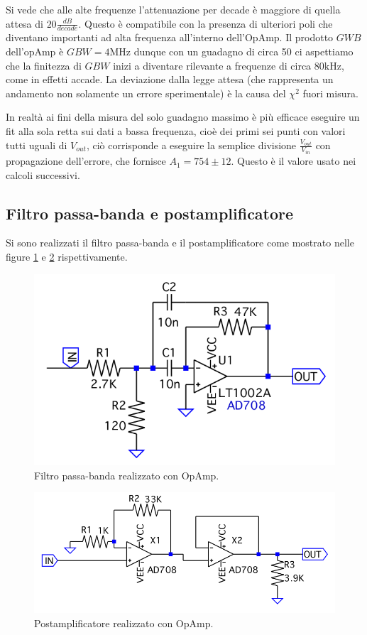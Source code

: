 \documentclass[10pt,a4paper]{article}
\begin{document}
Si vede che alle alte frequenze l'attenuazione per decade è maggiore di quella attesa di $20\frac{dB}{decade}$. Questo è compatibile con la presenza di ulteriori poli che diventano importanti ad alta frequenza all'interno dell'OpAmp. Il prodotto $GWB$ dell'opAmp è $GBW = 4 \mbox{MHz}$ dunque con un guadagno di circa 50 ci aspettiamo che la finitezza di $GBW$ inizi a diventare rilevante a frequenze di circa $80 \mbox{kHz}$, come in effetti accade. La deviazione dalla legge attesa (che rappresenta un andamento non solamente un errore sperimentale) è la causa del $\chi^2$ fuori misura.

In realtà ai fini della misura del solo guadagno massimo è più efficace eseguire un fit alla sola retta sui dati a bassa frequenza, cioè dei primi sei punti con valori tutti uguali di $V_{out}$, ciò corrisponde a eseguire la semplice divisione $\frac{V_{out}}{V_{in}}$ con propagazione dell'errore, che fornisce $A_1 = 754 \pm 12$. Questo è il valore usato nei calcoli successivi.

\subsection{Filtro passa-banda e postamplificatore}
Si sono realizzati il filtro passa-banda e il postamplificatore come mostrato nelle figure \ref{banda} e \ref{postamp} rispettivamente.

\begin{figure}[!htb]
\centering
\includegraphics[scale=0.5]{banda.png}
\caption{Filtro passa-banda realizzato con OpAmp.\label{banda}}
\end{figure}


\begin{figure}[!htb]
\centering
\includegraphics[scale=0.5]{postamp.png}
\caption{Postamplificatore realizzato con OpAmp.\label{postamp}}
\end{figure}
\end{document}
